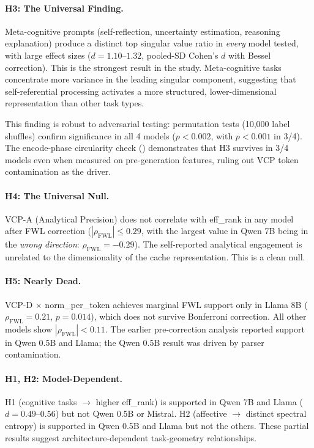 \documentclass[11pt,a4paper]{article}
\begin{document}
\paragraph{H3: The Universal Finding.} Meta-cognitive prompts (self-reflection, uncertainty estimation, reasoning explanation) produce a distinct top singular value ratio in \emph{every} model tested, with large effect sizes ($d = 1.10$--$1.32$, pooled-SD Cohen's $d$ with Bessel correction). This is the strongest result in the study. Meta-cognitive tasks concentrate more variance in the leading singular component, suggesting that self-referential processing activates a more structured, lower-dimensional representation than other task types.

This finding is robust to adversarial testing: permutation tests (10,000 label shuffles) confirm significance in all 4 models ($p < 0.002$, with $p < 0.001$ in 3/4). The encode-phase circularity check () demonstrates that H3 survives in 3/4 models even when measured on pre-generation features, ruling out VCP token contamination as the driver.

\paragraph{H4: The Universal Null.} VCP-A (Analytical Precision) does not correlate with eff\_rank in any model after FWL correction ($|\rho_{\text{FWL}}| \leq 0.29$, with the largest value in Qwen 7B being in the \emph{wrong direction}: $\rho_{\text{FWL}} = -0.29$). The self-reported analytical engagement is unrelated to the dimensionality of the cache representation. This is a clean null.

\paragraph{H5: Nearly Dead.} VCP-D $\times$ norm\_per\_token achieves marginal FWL support only in Llama 8B ($\rho_{\text{FWL}} = 0.21$, $p = 0.014$), which does not survive Bonferroni correction. All other models show $|\rho_{\text{FWL}}| < 0.11$. The earlier pre-correction analysis reported support in Qwen 0.5B and Llama; the Qwen 0.5B result was driven by parser contamination.

\paragraph{H1, H2: Model-Dependent.} H1 (cognitive tasks $\to$ higher eff\_rank) is supported in Qwen 7B and Llama ($d = 0.49$--$0.56$) but not Qwen 0.5B or Mistral. H2 (affective $\to$ distinct spectral entropy) is supported in Qwen 0.5B and Llama but not the others. These partial results suggest architecture-dependent task-geometry relationships.
\end{document}
